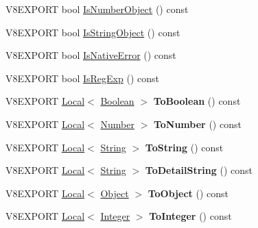 \begin{DoxyCompactItemize}
\item 
V8\+E\+X\+P\+O\+R\+T bool \hyperlink{classv8_1_1_value_a2b4dd15e4135823a4bb1128a60c063cf}{Is\+Number\+Object} () const 
\item 
V8\+E\+X\+P\+O\+R\+T bool \hyperlink{classv8_1_1_value_a2ded13f1962fc1fa15eabc525fb433ee}{Is\+String\+Object} () const 
\item 
V8\+E\+X\+P\+O\+R\+T bool \hyperlink{classv8_1_1_value_a11293ed56e068b3bccdae482f2752f58}{Is\+Native\+Error} () const 
\item 
V8\+E\+X\+P\+O\+R\+T bool \hyperlink{classv8_1_1_value_a36ba10231b5aaf6c63d8589cd53c9a73}{Is\+Reg\+Exp} () const 
\item 
\hypertarget{classv8_1_1_value_adb0df6e857c07ae754b032307d3b5dbe}{}V8\+E\+X\+P\+O\+R\+T \hyperlink{classv8_1_1_local}{Local}$<$ \hyperlink{classv8_1_1_boolean}{Boolean} $>$ {\bfseries To\+Boolean} () const \label{classv8_1_1_value_adb0df6e857c07ae754b032307d3b5dbe}

\item 
\hypertarget{classv8_1_1_value_a8c1789ff6f8986d0ab2dfb807b20f6c5}{}V8\+E\+X\+P\+O\+R\+T \hyperlink{classv8_1_1_local}{Local}$<$ \hyperlink{classv8_1_1_number}{Number} $>$ {\bfseries To\+Number} () const \label{classv8_1_1_value_a8c1789ff6f8986d0ab2dfb807b20f6c5}

\item 
\hypertarget{classv8_1_1_value_a170ac861b877d846c4a5d4365d493dd9}{}V8\+E\+X\+P\+O\+R\+T \hyperlink{classv8_1_1_local}{Local}$<$ \hyperlink{classv8_1_1_string}{String} $>$ {\bfseries To\+String} () const \label{classv8_1_1_value_a170ac861b877d846c4a5d4365d493dd9}

\item 
\hypertarget{classv8_1_1_value_a5f1c2fff87d9b9b7f27a690f037df13a}{}V8\+E\+X\+P\+O\+R\+T \hyperlink{classv8_1_1_local}{Local}$<$ \hyperlink{classv8_1_1_string}{String} $>$ {\bfseries To\+Detail\+String} () const \label{classv8_1_1_value_a5f1c2fff87d9b9b7f27a690f037df13a}

\item 
\hypertarget{classv8_1_1_value_a5b604dcae6581adb11de6f4fad43d1db}{}V8\+E\+X\+P\+O\+R\+T \hyperlink{classv8_1_1_local}{Local}$<$ \hyperlink{classv8_1_1_object}{Object} $>$ {\bfseries To\+Object} () const \label{classv8_1_1_value_a5b604dcae6581adb11de6f4fad43d1db}

\item 
\hypertarget{classv8_1_1_value_a361a09e3647fc2c8048cc721f4b80b2d}{}V8\+E\+X\+P\+O\+R\+T \hyperlink{classv8_1_1_local}{Local}$<$ \hyperlink{classv8_1_1_integer}{Integer} $>$ {\bfseries To\+Integer} () const \label{classv8_1_1_value_a361a09e3647fc2c8048cc721f4b80b2d}


\end{DoxyCompactItemize}
